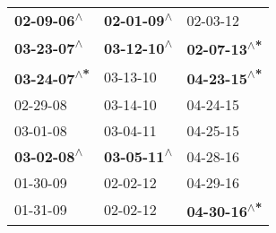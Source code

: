 \begin{supertabular}{lll}
  \textbf{02-09-06\textsuperscript{$\wedge$}} &  \textbf{02-01-09\textsuperscript{$\wedge$}} &                    02-03-12\textsuperscript{} \\
  \textbf{03-23-07\textsuperscript{$\wedge$}} &  \textbf{03-12-10\textsuperscript{$\wedge$}} &  \textbf{02-07-13\textsuperscript{$\wedge$*}} \\
 \textbf{03-24-07\textsuperscript{$\wedge$*}} &                   03-13-10\textsuperscript{} &  \textbf{04-23-15\textsuperscript{$\wedge$*}} \\
                   02-29-08\textsuperscript{} &                   03-14-10\textsuperscript{} &                    04-24-15\textsuperscript{} \\
                   03-01-08\textsuperscript{} &                   03-04-11\textsuperscript{} &                    04-25-15\textsuperscript{} \\
  \textbf{03-02-08\textsuperscript{$\wedge$}} &  \textbf{03-05-11\textsuperscript{$\wedge$}} &                    04-28-16\textsuperscript{} \\
                   01-30-09\textsuperscript{} &                   02-02-12\textsuperscript{} &                    04-29-16\textsuperscript{} \\
                   01-31-09\textsuperscript{} &                   02-02-12\textsuperscript{} &  \textbf{04-30-16\textsuperscript{$\wedge$*}} \\
\end{supertabular}
